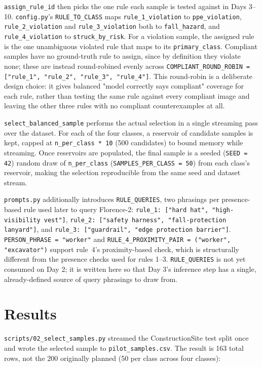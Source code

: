 \texttt{assign\_rule\_id} then picks the one rule each sample is tested against in Days 3--10.
\texttt{config.py}'s \texttt{RULE\_TO\_CLASS} maps \texttt{rule\_1\_violation} to
\texttt{ppe\_violation}, \texttt{rule\_2\_violation} and \texttt{rule\_3\_violation} both to
\texttt{fall\_hazard}, and \texttt{rule\_4\_violation} to \texttt{struck\_by\_risk}. For a violation
sample, the assigned rule is the one unambiguous violated rule that maps to its
\texttt{primary\_class}. Compliant samples have no ground-truth rule to assign, since by
definition they violate none; these are instead round-robined evenly across
\texttt{COMPLIANT\_ROUND\_ROBIN = ["rule\_1", "rule\_2", "rule\_3", "rule\_4"]}. This round-robin is
a deliberate design choice: it gives balanced "model correctly says compliant" coverage for each
rule, rather than testing the same rule against every compliant image and leaving the other three
rules with no compliant counterexamples at all.

\texttt{select\_balanced\_sample} performs the actual selection in a single streaming pass over the
dataset. For each of the four classes, a reservoir of candidate samples is kept, capped at
\texttt{n\_per\_class * 10} (500 candidates) to bound memory while streaming. Once reservoirs are
populated, the final sample is a seeded (\texttt{SEED = 42}) random draw of \texttt{n\_per\_class}
(\texttt{SAMPLES\_PER\_CLASS = 50}) from each class's reservoir, making the selection reproducible
from the same seed and dataset stream.

\texttt{prompts.py} additionally introduces \texttt{RULE\_QUERIES}, two phrasings per presence-based
rule used later to query Florence-2: \texttt{rule\_1: ["hard hat", "high-visibility vest"]},
\texttt{rule\_2: ["safety harness", "fall-protection lanyard"]}, and \texttt{rule\_3: ["guardrail",
"edge protection barrier"]}. \texttt{PERSON\_PHRASE = "worker"} and
\texttt{RULE\_4\_PROXIMITY\_PAIR = ("worker", "excavator")} support rule~4's proximity-based check,
which is structurally different from the presence checks used for rules 1--3. \texttt{RULE\_QUERIES}
is not yet consumed on Day 2; it is written here so that Day 3's inference step has a single,
already-defined source of query phrasings to draw from.

\section{Results}

\texttt{scripts/02\_select\_samples.py} streamed the ConstructionSite test split once and wrote the
selected sample to \texttt{pilot\_samples.csv}. The result is 163 total rows, not the 200 originally
planned (50 per class across four classes):

